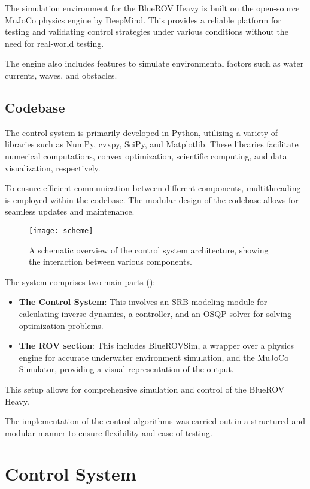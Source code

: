     The simulation environment for the BlueROV Heavy is built on the open-source MuJoCo physics engine by DeepMind. This provides a reliable platform for testing and validating control strategies under various conditions without the need for real-world testing. 

    The engine also includes features to simulate environmental factors such as water currents, waves, and obstacles.

\subsection{Codebase}

    The control system is primarily developed in Python, utilizing a variety of libraries such as NumPy, cvxpy, SciPy, and Matplotlib. These libraries facilitate numerical computations, convex optimization, scientific computing, and data visualization, respectively. 

    To ensure efficient communication between different components, multithreading is employed within the codebase. The modular design of the codebase allows for seamless updates and maintenance.

    \begin{figure}[H]
        \centering\texttt{[image: scheme]}
        \caption{A schematic overview of the control system architecture, showing the interaction between various components.}
        \label{image:scheme2}
    \end{figure}

    The system comprises two main parts ():
    \begin{itemize}
        \item \textbf{The Control System}: This involves an SRB modeling module for calculating inverse dynamics, a controller, and an OSQP solver for solving optimization problems.
        \item \textbf{The ROV section}: This includes BlueROVSim, a wrapper over a physics engine for accurate underwater environment simulation, and the MuJoCo Simulator, providing a visual representation of the output.
    \end{itemize}
    This setup allows for comprehensive simulation and control of the BlueROV Heavy.

    The implementation of the control algorithms was carried out in a structured and modular manner to ensure flexibility and ease of testing.

\section{Control System}

